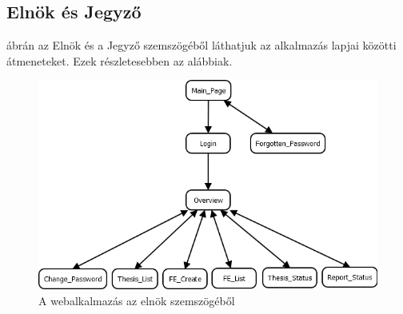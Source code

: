 \subsection{Elnök és Jegyző}

 ábrán az Elnök és a Jegyző szemszögéből láthatjuk az alkalmazás lapjai közötti átmeneteket. Ezek részletesebben az alábbiak.

\begin{figure}[h]
\centering
\includegraphics[scale=0.5]{images/Elnok.png}
\caption{A webalkalmazás az elnök szemszögéből}
\label{fig:elnok}
\end{figure}

